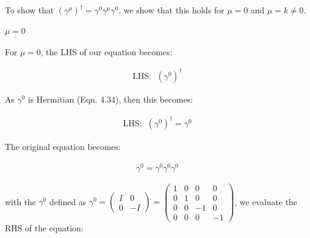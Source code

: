 \documentclass[11pt]{article}
\theoremstyle{definition}
\begin{document}
To show that $(\gamma^{\mu})^{\dagger} = \gamma^{0} \gamma^{\mu} \gamma^{0}$, we show that this holds for $\mu=0$ and $\mu= k \neq 0$. \newline

$\underline{\mu=0}$

For $\mu=0$, the LHS of our equation becomes:

\begin{align*}
    \text{LHS: }\; (\gamma^{0})^{\dagger}
\end{align*}

As $\gamma^{0}$ is Hermitian (Eqn. 4.34), then this becomes:

\begin{align*}
    \text{LHS: }\; (\gamma^{0})^{\dagger} = \gamma^{0}
\end{align*}

The original equation becomes:

\begin{align*}
    \gamma^{0} = \gamma^{0}\gamma^{0}\gamma^{0}
\end{align*}

with the $\gamma^{0}$ defined as $\gamma^{0} = \begin{pmatrix}
    I & 0 \\
    0 & -I
\end{pmatrix} = \begin{pmatrix}1&0&0&0\\ 0&1&0&0\\ 0&0&-1&0\\ 0&0&0&-1 \end{pmatrix}$, we evaluate the RHS of the equation:
\end{document}
